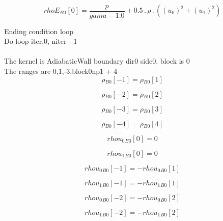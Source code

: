\documentclass{article}
\begin{document}
\begin{dmath}{rhoE{_{B0}}}[{0}] = \frac{p}{gama - 1.0} + 0.5 \,.\, \rho \,.\, \left(\left(u_{0} \right)^{2} + \left(u_{1} \right)^{2}\right)\end{dmath}

\noindent Ending condition loop %
\\\noindent Do loop iter,0, niter - 1\\
\\\noindent The kernel is AdiabaticWall boundary dir0 side0, block is 0\\\noindent The ranges are 0,1,-3,block0np1 + 4\\\begin{dmath}{\rho{_{B0}}}[{-1}] = {\rho{_{B0}}}[{1}]\end{dmath}

\begin{dmath}{\rho{_{B0}}}[{-2}] = {\rho{_{B0}}}[{2}]\end{dmath}

\begin{dmath}{\rho{_{B0}}}[{-3}] = {\rho{_{B0}}}[{3}]\end{dmath}

\begin{dmath}{\rho{_{B0}}}[{-4}] = {\rho{_{B0}}}[{4}]\end{dmath}

\begin{dmath}{rhou_{0}{_{B0}}}[{0}] = 0\end{dmath}

\begin{dmath}{rhou_{1}{_{B0}}}[{0}] = 0\end{dmath}

\begin{dmath}{rhou_{0}{_{B0}}}[{-1}] = - {rhou_{0}{_{B0}}}[{1}]\end{dmath}

\begin{dmath}{rhou_{1}{_{B0}}}[{-1}] = - {rhou_{1}{_{B0}}}[{1}]\end{dmath}

\begin{dmath}{rhou_{0}{_{B0}}}[{-2}] = - {rhou_{0}{_{B0}}}[{2}]\end{dmath}

\begin{dmath}{rhou_{1}{_{B0}}}[{-2}] = - {rhou_{1}{_{B0}}}[{2}]\end{dmath}
\end{document}
